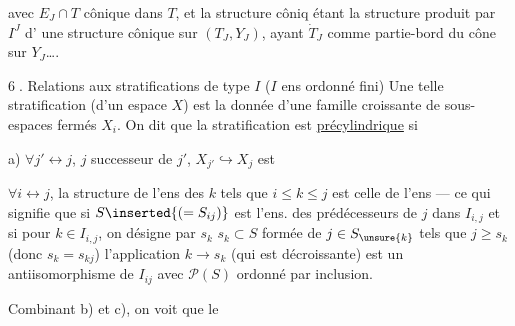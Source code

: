 avec $E_J\cap T$ cônique dans $T$, et la structure côniq
 étant la structure produit par $I^J$ d'
une structure cônique sur $(T_J,Y_J)$, ayant
$\dot T_J$ comme partie-bord du cône sur $Y_J$\ldots.


\textcircled{6.} Relations aux stratifications de type $I$
($I$ ens ordonné fini)
Une telle stratification (d'un espace $X$) est
la donnée d'une famille croissante de
sous-espaces fermés $X_i$. On dit que
la stratification est \uline{précylindrique} si

a) $\forall j'\leftrightarrow j$, $j$ successeur de $j'$,
$X_{j'}\hookrightarrow X_j$ est
 



$\forall i\leftrightarrow j$, la structure de l'ens 
des $k$ tels que $i\le k\le j$ est celle de l'ens
  --- ce qui signifie que
si $S\inserted{(=S_{ij})}$ est l'ens. des prédécesseurs de $j$ dans
$I_{i,j}$ 
et si pour \unsure{$\forall$} $k\in I_{i,j}$, on désigne
 par $s_k$   $s_k\subset S$ formée
de $j\in S_{\unsure{k}}$ tels que
$j\ge s_k$ (donc $s_k=s_{kj}$)
l'application $k\longrightarrow s_k$ (qui est décroissante)
est un antiisomorphisme de $I_{ij}$ avec $\mathcal P(S)$
ordonné par inclusion. 




Combinant b) et c), on voit que le
